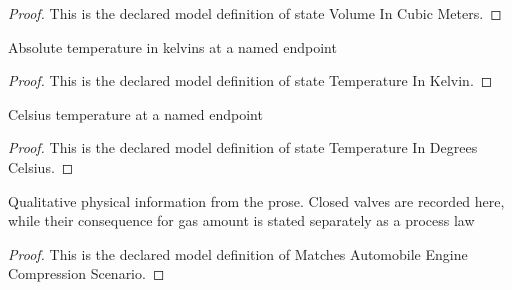\begin{proof}
  This is the declared model definition of state Volume In Cubic Meters.
\end{proof}
\begin{definition}
  \label{def:physics:phyx-mini-0469:phyxminiproblems-problemphyxmini0469-statetemperatureinkelvin}
  Absolute temperature in kelvins at a named endpoint
\end{definition}
\begin{proof}
  This is the declared model definition of state Temperature In Kelvin.
\end{proof}
\begin{definition}
  \label{def:physics:phyx-mini-0469:phyxminiproblems-problemphyxmini0469-statetemperatureindegreescelsius}
  Celsius temperature at a named endpoint
\end{definition}
\begin{proof}
  This is the declared model definition of state Temperature In Degrees Celsius.
\end{proof}
\begin{definition}
  \label{def:physics:phyx-mini-0469:phyxminiproblems-problemphyxmini0469-matchesautomobileenginecompressionscenario}
  Qualitative physical information from the prose. Closed valves are recorded here, while their consequence for gas amount is stated separately as a process law
\end{definition}
\begin{proof}
  This is the declared model definition of Matches Automobile Engine Compression Scenario.
\end{proof}

